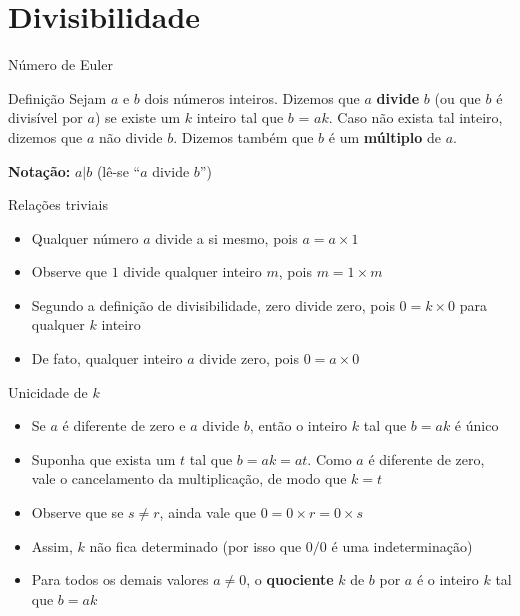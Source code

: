 \section*{Divisibilidade}

\begin{frame}[fragile]{Número de Euler}

    \begin{block}{Definição}
        Sejam $a$ e $b$ dois números inteiros. Dizemos que $a$ \textbf{divide} $b$ (ou que $b$ é divisível por $a$) se existe um $k$ inteiro tal que $b$ = $ak$. Caso não exista tal inteiro, dizemos que $a$ não divide $b$. Dizemos também que $b$ é um \textbf{múltiplo} de $a$.  

        \vspace{0.1in}
        \textbf{Notação:} $a|b$ (lê-se ``$a$ divide $b$'')
    \end{block}

\end{frame}

\begin{frame}[fragile]{Relações triviais}

    \begin{itemize}
        \item Qualquer número $a$ divide a si mesmo, pois $a = a\times 1$

        \item Observe que $1$ divide qualquer inteiro $m$, pois $m =  1 \times m$

        \item Segundo a definição de divisibilidade, zero divide zero, pois $0 = k \times 0$ para qualquer $k$ inteiro  

        \item De fato, qualquer inteiro $a$ divide zero, pois $0 = a\times 0$
    \end{itemize}

\end{frame}

\begin{frame}[fragile]{Unicidade de $k$}

    \begin{itemize}
        \item Se $a$ é diferente de zero e $a$ divide $b$, então o inteiro $k$ tal que $b = ak$ é único

        \item Suponha que exista um $t$ tal que $b = ak = at$. Como $a$ é diferente de zero, vale o cancelamento da multiplicação, de modo que $k = t$

        \item Observe que se $s \neq r$, ainda vale que $0 = 0 \times r = 0 \times s$

        \item Assim, $k$ não fica determinado (por isso que $0/0$ é uma indeterminação)

        \item Para todos os demais valores $a \neq 0$, o \textbf{quociente} $k$ de $b$ por $a$ é o inteiro $k$ tal que $b = ak$
    \end{itemize}

\end{frame}

